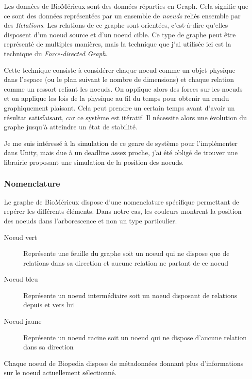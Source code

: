 Les données de BioMérieux sont des données réparties en Graph.
Cela signifie que ce sont des données représentées par un ensemble de \emph{noeuds} reliés ensemble par des \emph{Relations}.
Les relations de ce graphe sont orientées, c'est-à-dire qu'elles disposent d'un noeud source et d'un noeud cible.
Ce type de graphe peut être représenté de multiples manières, mais la technique que j'ai utilisée ici est la technique du \emph{Force-directed Graph}.

Cette technique consiste à considérer chaque noeud comme un objet physique dans l'espace (ou le plan suivant le nombre de dimensions) et chaque relation comme un ressort reliant les noeuds.
On applique alors des forces sur les noeuds et on applique les lois de la physique au fil du temps pour obtenir un rendu graphiquement plaisant.
Cela peut prendre un certain temps avant d'avoir un résultat satisfaisant, car ce système est itératif.
Il nécessite alors une évolution du graphe jusqu'à atteindre un état de stabilité.

Je me suis intéressé à la simulation de ce genre de système pour l'implémenter dans Unity, mais due à un deadline assez proche, j'ai été obligé de trouver une librairie proposant une simulation de la position des noeuds.

\subsubsection{Nomenclature}
\label{biomerieuxBiopediaNomenclature}

Le graphe de BioMérieux dispose d'une nomenclature spécifique permettant de repérer les différents éléments.
Dans notre cas, les couleurs montrent la position des noeuds dans l'arborescence et non un type particulier.

\begin{description}
    \item[Noeud vert] Représente une feuille du graphe soit un noeud qui ne dispose que de relations dans sa direction et aucune relation ne partant de ce noeud
    \item[Noeud bleu] Représente un noeud intermédiaire soit un noeud disposant de relations depuis et vers lui
    \item[Noeud jaune] Représente un noeud racine soit un noeud qui ne dispose d'aucune relation dans sa direction
\end{description}

Chaque noeud de Biopedia dispose de métadonnées donnant plus d'informations sur le noeud actuellement sélectionné.

